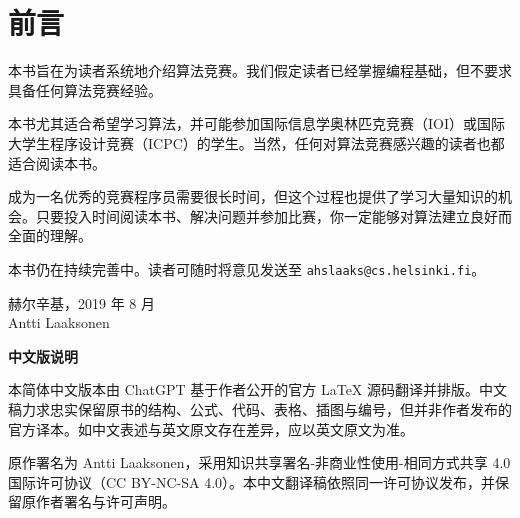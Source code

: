 \chapter*{前言}

本书旨在为读者系统地介绍算法竞赛。我们假定读者已经掌握编程基础，但不要求具备任何算法竞赛经验。

本书尤其适合希望学习算法，并可能参加国际信息学奥林匹克竞赛（IOI）或国际大学生程序设计竞赛（ICPC）的学生。当然，任何对算法竞赛感兴趣的读者也都适合阅读本书。

成为一名优秀的竞赛程序员需要很长时间，但这个过程也提供了学习大量知识的机会。只要投入时间阅读本书、解决问题并参加比赛，你一定能够对算法建立良好而全面的理解。

本书仍在持续完善中。读者可随时将意见发送至 \texttt{ahslaaks@cs.helsinki.fi}。

\begin{flushright}
赫尔辛基，2019 年 8 月 \\
Antti Laaksonen
\end{flushright}

\bigskip
\noindent\textbf{中文版说明}

本简体中文版本由 ChatGPT 基于作者公开的官方 \LaTeX{} 源码翻译并排版。中文稿力求忠实保留原书的结构、公式、代码、表格、插图与编号，但并非作者发布的官方译本。如中文表述与英文原文存在差异，应以英文原文为准。

原作署名为 Antti Laaksonen，采用知识共享署名-非商业性使用-相同方式共享 4.0 国际许可协议（CC BY-NC-SA 4.0）。本中文翻译稿依照同一许可协议发布，并保留原作者署名与许可声明。
